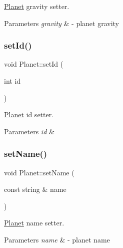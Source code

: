 \hyperlink{class_planet}{Planet} gravity setter. 


\begin{DoxyParams}{Parameters}
{\em gravity} & -\/ planet gravity \\
\hline
\end{DoxyParams}
\mbox{\label{class_planet_a7d7dda816ee836db4e7970a4f3d37335}} 
\subsubsection{\texorpdfstring{set\+Id()}{setId()}}
{\footnotesize\ttfamily void Planet\+::set\+Id (\begin{DoxyParamCaption}\item[{int}]{id }\end{DoxyParamCaption})}



\hyperlink{class_planet}{Planet} id setter. 


\begin{DoxyParams}{Parameters}
{\em id} & \\
\hline
\end{DoxyParams}
\mbox{\label{class_planet_a8ef9f3f438cb24092e611df2379c457d}} 
\subsubsection{\texorpdfstring{set\+Name()}{setName()}}
{\footnotesize\ttfamily void Planet\+::set\+Name (\begin{DoxyParamCaption}\item[{const string \&}]{name }\end{DoxyParamCaption})}



\hyperlink{class_planet}{Planet} name setter. 


\begin{DoxyParams}{Parameters}
{\em name} & -\/ planet name \\
\hline
\end{DoxyParams}
\mbox{\label{class_planet_a83d383c179b3254cb7a525b824da5b98}} 
